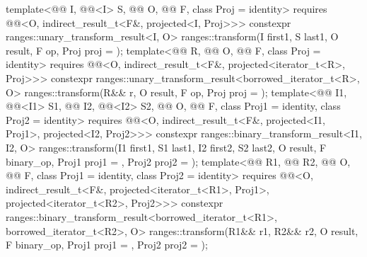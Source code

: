 \begin{itemdecl}
template<@@ I, @@<I> S, @@ O,
         @@ F, class Proj = identity>
  requires @@<O, indirect_result_t<F&, projected<I, Proj>>>
  constexpr ranges::unary_transform_result<I, O>
    ranges::transform(I first1, S last1, O result, F op, Proj proj = {});
template<@@ R, @@ O, @@ F,
         class Proj = identity>
  requires @@<O, indirect_result_t<F&, projected<iterator_t<R>, Proj>>>
  constexpr ranges::unary_transform_result<borrowed_iterator_t<R>, O>
    ranges::transform(R&& r, O result, F op, Proj proj = {});
template<@@ I1, @@<I1> S1, @@ I2, @@<I2> S2,
         @@ O, @@ F, class Proj1 = identity,
         class Proj2 = identity>
  requires @@<O, indirect_result_t<F&, projected<I1, Proj1>,
                                         projected<I2, Proj2>>>
  constexpr ranges::binary_transform_result<I1, I2, O>
    ranges::transform(I1 first1, S1 last1, I2 first2, S2 last2, O result,
                      F binary_op, Proj1 proj1 = {}, Proj2 proj2 = {});
template<@@ R1, @@ R2, @@ O,
         @@ F, class Proj1 = identity, class Proj2 = identity>
  requires @@<O, indirect_result_t<F&, projected<iterator_t<R1>, Proj1>,
                                         projected<iterator_t<R2>, Proj2>>>
  constexpr ranges::binary_transform_result<borrowed_iterator_t<R1>, borrowed_iterator_t<R2>, O>
    ranges::transform(R1&& r1, R2&& r2, O result,
                      F binary_op, Proj1 proj1 = {}, Proj2 proj2 = {});
\end{itemdecl}

